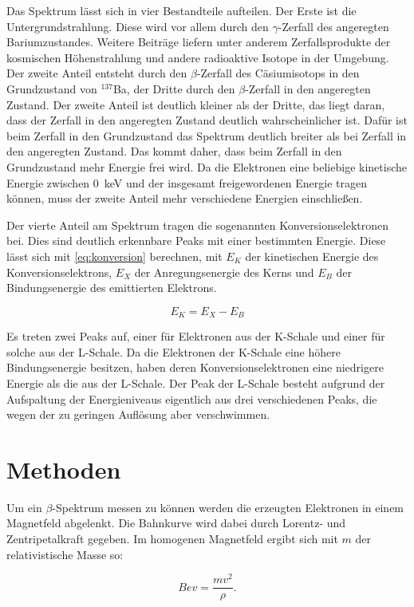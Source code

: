 Das Spektrum lässt sich in vier Bestandteile aufteilen. Der Erste ist die Untergrundstrahlung. Diese wird vor allem durch den $\gamma$-Zerfall des angeregten Bariumzustandes. Weitere Beiträge liefern unter anderem Zerfallsprodukte der kosmischen Höhenstrahlung und andere radioaktive Isotope in der Umgebung.
Der zweite Anteil entsteht durch den $\beta$-Zerfall des Cäsiumisotops in den Grundzustand von $^{137}$Ba, der Dritte durch den $\beta$-Zerfall in den angeregten Zustand. Der zweite Anteil ist deutlich kleiner als der Dritte, das liegt daran, dass der Zerfall in den angeregten Zustand deutlich wahrscheinlicher ist. Dafür ist beim Zerfall in den Grundzustand das Spektrum deutlich breiter als bei Zerfall in den angeregten Zustand. Das kommt daher, dass beim Zerfall in den Grundzustand mehr Energie frei wird. Da die Elektronen eine beliebige kinetische Energie zwischen \SI{0}{keV} und der insgesamt freigewordenen Energie tragen können, muss der zweite Anteil mehr verschiedene Energien einschließen.

Der vierte Anteil am Spektrum tragen die sogenannten Konversionselektronen bei. Dies sind deutlich erkennbare Peaks mit einer bestimmten Energie. Diese lässt sich mit \cref{eq:konversion} berechnen, mit $E_K$ der kinetischen Energie des Konversionselektrons, $E_X$ der Anregungsenergie des Kerns und $E_B$ der Bindungsenergie des emittierten Elektrons.

\begin{equation}
E_K = E_X - E_B
\label{eq:konversion}
\end{equation}

Es treten zwei Peaks auf, einer für Elektronen aus der K-Schale und einer für solche aus der L-Schale. Da die Elektronen der K-Schale eine höhere Bindungsenergie besitzen, haben deren Konversionselektronen eine niedrigere Energie als die aus der L-Schale. Der Peak der L-Schale besteht aufgrund der Aufspaltung der Energieniveaus eigentlich aus drei verschiedenen Peaks, die wegen der zu geringen Auflösung aber verschwimmen.

\section{Methoden}
Um ein $\beta$-Spektrum messen zu können werden die erzeugten Elektronen in einem Magnetfeld abgelenkt. Die Bahnkurve wird dabei durch Lorentz- und Zentripetalkraft gegeben. Im homogenen Magnetfeld ergibt sich mit $m$ der relativistische Masse so:

\begin{equation}
Bev = \frac{mv^2}{\rho}.
\label{bfeld}
\end{equation}

